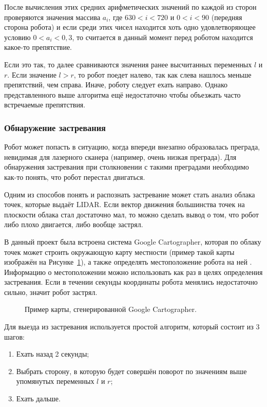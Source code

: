 После вычисления этих средних арифметических значений по каждой из сторон проверяются значения массива $a_i$, где $630 < i < 720$ и $0 < i < 90$ (передняя сторона робота) и если среди этих чисел находится хоть одно удовлетворяющее условию $0 < a_i < 0,3$, то считается в данный момент перед роботом находится какое-то препятствие.

Если это так, то далее сравниваются значения ранее высчитанных переменных $l$ и $r$. Если значение $l > r$, то робот поедет налево, так как слева нашлось меньше препятствий, чем справа. Иначе, роботу следует ехать направо. Однако представленного выше алгоритма ещё недостаточно чтобы объезжать часто встречаемые препятствия. 

\subsubsection{Обнаружение застревания}

Робот может попасть в ситуацию, когда впереди внезапно образовалась преграда, невидимая для лазерного сканера (например, очень низкая преграда). Для обнаружения застревания при столкновении с такими преградами необходимо как-то понять, что робот перестал двигаться. 

Одним из способов понять и распознать застревание может стать анализ облака точек, которые выдаёт LIDAR. Если вектор движения большинства точек на плоскости облака стал достаточно мал, то можно сделать вывод о том, что робот либо плохо двигается, либо вообще застрял. 

В данный проект была встроена система Google Cartographer, которая по облаку точек может строить окружающую карту местности (пример такой карты изображён на Рисунке~\ref{fig:cartographer-example}), а также определять местоположение робота на ней . Информацию о местоположении можно использовать как раз в целях определения застревания. Если в течении секунды координаты робота менялись недостаточно сильно, значит робот застрял.

\begin{figure}[ht]
  \caption{Пример карты, сгенерированной Google Cartographer.}\label{fig:cartographer-example}
\end{figure}

Для выезда из застревания используется простой алгоритм, который состоит из 3 шагов:

\begin{enumerate}
\item Ехать назад 2 секунды;
\item Выбрать сторону, в которую будет совершён поворот по значениям выше упомянутых переменных $l$ и $r$;
\item Ехать дальше.
\end{enumerate}

